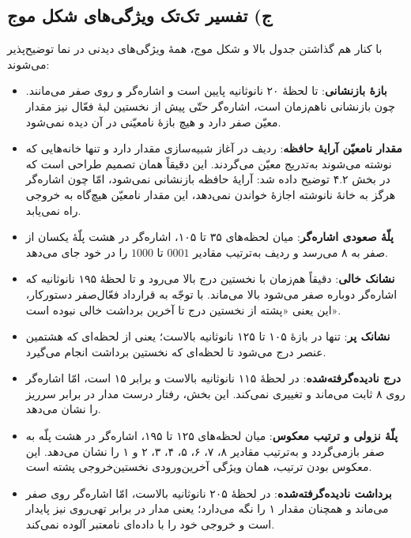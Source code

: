 \documentclass[12pt,a4paper]{article}
\begin{document}

	\subsection*{ج) تفسیر تک‌تک ویژگی‌های شکل موج}
	با کنار هم گذاشتن جدول بالا و شکل موج، همهٔ ویژگی‌های دیدنی در نما توضیح‌پذیر می‌شوند:

	\begin{itemize}
		\item \textbf{بازهٔ بازنشانی}: تا لحظهٔ ۲۰ نانوثانیه  پایین است و اشاره‌گر و  روی صفر می‌مانند. چون بازنشانی ناهم‌زمان است، اشاره‌گر حتّی پیش از نخستین لبهٔ فعّال نیز مقدار معیّن صفر دارد و هیچ بازهٔ نامعیّنی در آن دیده نمی‌شود.
		\item \textbf{مقدار نامعیّن آرایهٔ حافظه}: ردیف  در آغاز شبیه‌سازی مقدار  دارد و تنها خانه‌هایی که نوشته می‌شوند به‌تدریج معیّن می‌گردند. این دقیقاً همان تصمیم طراحی است که در بخش ۴.۲ توضیح داده شد: آرایهٔ حافظه بازنشانی نمی‌شود، امّا چون اشاره‌گر هرگز به خانهٔ نانوشته اجازهٔ خواندن نمی‌دهد، این مقدار نامعیّن هیچ‌گاه به خروجی راه نمی‌یابد.
		\item \textbf{پلّهٔ صعودی اشاره‌گر}: میان لحظه‌های ۳۵ تا ۱۰۵، اشاره‌گر در هشت پلّهٔ یکسان از صفر به ۸ می‌رسد و ردیف  به‌ترتیب مقادیر \(0001\) تا \(1000\) را در خود جای می‌دهد.
		\item \textbf{نشانک خالی}:  دقیقاً هم‌زمان با نخستین درج بالا می‌رود و تا لحظهٔ ۱۹۵ نانوثانیه که اشاره‌گر دوباره صفر می‌شود بالا می‌ماند. با توجّه به قرارداد فعّال‌صفر دستورکار، این یعنی «پشته از نخستین درج تا آخرین برداشت خالی نبوده است».
		\item \textbf{نشانک پر}:  تنها در بازهٔ ۱۰۵ تا ۱۲۵ نانوثانیه بالاست؛ یعنی از لحظه‌ای که هشتمین عنصر درج می‌شود تا لحظه‌ای که نخستین برداشت انجام می‌گیرد.
		\item \textbf{درج نادیده‌گرفته‌شده}: در لحظهٔ ۱۱۵ نانوثانیه  بالاست و  برابر ۱۵ است، امّا اشاره‌گر روی ۸ ثابت می‌ماند و  تغییری نمی‌کند. این بخش، رفتار درست مدار در برابر سرریز را نشان می‌دهد.
		\item \textbf{پلّهٔ نزولی و ترتیب معکوس}: میان لحظه‌های ۱۲۵ تا ۱۹۵، اشاره‌گر در هشت پلّه به صفر بازمی‌گردد و  به‌ترتیب مقادیر ۸، ۷، ۶، ۵، ۴، ۳، ۲ و ۱ را نشان می‌دهد. این معکوس بودن ترتیب، همان ویژگی آخرین‌ورودی نخستین‌خروجی پشته است.
		\item \textbf{برداشت نادیده‌گرفته‌شده}: در لحظهٔ ۲۰۵ نانوثانیه  بالاست، امّا اشاره‌گر روی صفر می‌ماند و  همچنان مقدار ۱ را نگه می‌دارد؛ یعنی مدار در برابر تهی‌روی نیز پایدار است و خروجی خود را با داده‌ای نامعتبر آلوده نمی‌کند.

\end{itemize}
\end{document}
